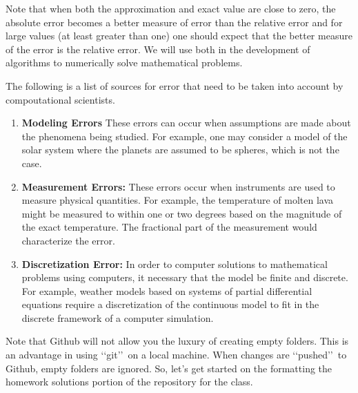 \documentclass[10pt,fleqn]{article}
\begin{document}
Note that when both the approximation and exact value are close to zero, the
absolute error becomes a better measure of error than the relative error and
for large values (at least greater than one) one should expect that the better
measure of the error is the relative error. We will use both in the development
of algorithms to numerically solve mathematical problems.






The following is a list of sources for error that need to be taken into account
by compoutational scientists.
\begin{enumerate}
  \item {\bf Modeling Errors} These errors can occur when assumptions are made
        about the phenomena being studied. For example, one may consider a model
        of the solar system where the planets are assumed to be spheres, which
        is not the case.
  \item {\bf Measurement Errors:} These errors occur when instruments are used
        to measure physical quantities. For example, the temperature of molten
        lava might be measured to within one or two degrees based on the
        magnitude of the exact temperature. The fractional part of the 
        measurement would characterize the error.
  \item {\bf Discretization Error:} In order to computer solutions to
        mathematical problems using computers, it necessary that the model be
        finite and discrete. For example, weather models based on systems of
        partial differential equations require a discretization of the continuous model to fit in the
        discrete framework of a computer simulation.
\end{enumerate}
Note that Github will not allow you the luxury of creating empty folders. This
is an advantage in using \lq\lq git\rq\rq\ on a local machine. When changes are
\lq\lq pushed\rq\rq\ to Github, empty folders are ignored. So, let's get started
on the formatting the homework solutions portion of the repository for the
class.
\end{document}
